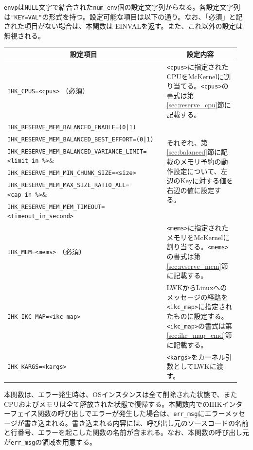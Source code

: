 \documentclass[twoside,11pt,fleqn]{book}
\begin{document}
\verb:envp:は\verb:NULL:文字で結合された\verb:num_env:個の設定文字列からなる。各設定文字列は\verb:"KEY=VAL":の形式を持つ。設定可能な項目は以下の通り。なお、「必須」と記された項目がない場合は、本関数は-EINVALを返す。また、これ以外の設定は無視される。
\begin{table}[!h]
\footnotesize
\begin{tabular}{|p{0.65\linewidth}|p{0.30\linewidth}|} \hline
\multicolumn{1}{|c}{\textbf{設定項目}}&\multicolumn{1}{|c|}{\textbf{設定内容}}\\ \hline \hline
\verb:IHK_CPUS=<cpus>: （必須）&\verb:<cpus>:に指定されたCPUをMcKernelに割り当てる。\verb:<cpus>:の書式は第\ref{sec:reserve_cpu}節に記載する。\\ \hline
\verb:IHK_RESERVE_MEM_BALANCED_ENABLE=(0|1):&\multirow{6}{\linewidth}{それぞれ、第\ref{sec:balanced}節に記載のメモリ予約の動作設定について、左辺のKeyに対する値を右辺の値に設定する。}\\
\verb:IHK_RESERVE_MEM_BALANCED_BEST_EFFORT=(0|1):&\\
\verb:IHK_RESERVE_MEM_BALANCED_VARIANCE_LIMIT=<limit_in_%>:&\\
\verb:IHK_RESERVE_MEM_MIN_CHUNK_SIZE=<size>:&\\
\verb:IHK_RESERVE_MEM_MAX_SIZE_RATIO_ALL=<cap_in_%>:&\\
\verb:IHK_RESERVE_MEM_MEM_TIMEOUT=<timeout_in_second>:&\\ \hline
\verb:IHK_MEM=<mems>: （必須）&\verb:<mems>:に指定されたメモリをMcKernelに割り当てる。\verb:<mems>:の書式は第\ref{sec:reserve_mem}節に記載する。\\ \hline
\verb:IHK_IKC_MAP=<ikc_map>:&LWKからLinuxへのメッセージの経路を\verb:<ikc_map>:に指定されたものに設定する。\verb:<ikc_map>:の書式は第\ref{sec:ikc_map_cmd}節に記載する。\\ \hline
\verb:IHK_KARGS=<kargs>:&\verb:<kargs>:をカーネル引数としてLWKに渡す。\\ \hline
\end{tabular}
\vspace{-0em}
\end{table}
\FloatBarrier

本関数は、エラー発生時は、OSインスタンスは全て削除された状態で、またCPUおよびメモリは全て解放された状態で復帰する。本関数内でのIHKインターフェイス関数の呼び出しでエラーが発生した場合は、\verb:err_msg:にエラーメッセージが書き込まれる。書き込まれる内容には、呼び出し元のソースコードの名前と行番号、エラーを起こした関数の名前が含まれる。なお、本関数の呼び出し元が\verb:err_msg:の領域を用意する。
\end{document}
